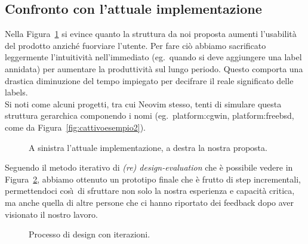 \documentclass[12pt]{article} %
\begin{document}
\subsection{Confronto con l'attuale implementazione}
Nella Figura~\ref{fig:confronto} si evince quanto la struttura da noi proposta aumenti l'usabilit\`a del prodotto anzich\'e fuorviare l'utente. Per fare ci\`o abbiamo sacrificato leggermente l'intuitivit\`a nell'immediato (eg.\ quando si deve aggiungere una label annidata) per aumentare la produttivit\`a sul lungo periodo. Questo comporta una drastica diminuzione del tempo impiegato per decifrare il reale significato delle labels.\\
Si noti come alcuni progetti, tra cui Neovim stesso, tenti di simulare questa struttura gerarchica componendo i nomi (eg.\ platform:cgwin, platform:freebsd, come da Figura~\ref{fig:cattivoesempio2}).

\begin{figure}[H]
\caption{A sinistra l'attuale implementazione, a destra la nostra proposta.}
\label{fig:confronto}
\end{figure}

Seguendo il metodo iterativo di \emph{(re) design-evaluation} che \`e possibile vedere in Figura~\ref{fig:ciclo}, abbiamo ottenuto un prototipo finale che \`e frutto di step incrementali, permettendoci cos\`\i\ di sfruttare non solo la nostra esperienza e capacit\`a critica, ma anche quella di altre persone che ci hanno riportato dei feedback dopo aver visionato il nostro lavoro.

\begin{figure}[H]
\caption{Processo di design con iterazioni.}
\label{fig:ciclo}
\end{figure}
\end{document}
